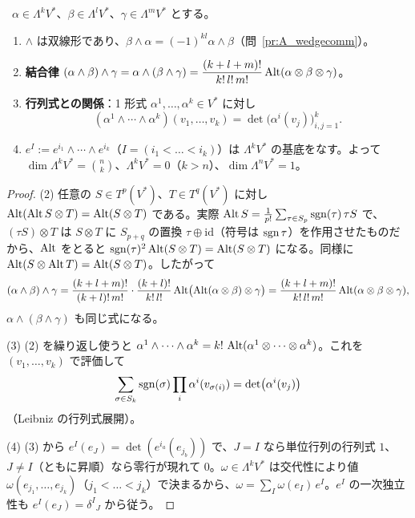 \begin{prop}[外積の基本性質]\label{A:prop:wedge}
\tP\ $\alpha\in\Lambda^kV^*$、$\beta\in\Lambda^lV^*$、$\gamma\in\Lambda^mV^*$ とする。
\begin{enumerate}
\item $\wedge$ は双線形であり、$\beta\wedge\alpha=(-1)^{kl}\alpha\wedge\beta$（問~\ref{pr:A_wedgecomm}）。
\item \textbf{結合律} $(\alpha\wedge\beta)\wedge\gamma=\alpha\wedge(\beta\wedge\gamma)=\dfrac{(k+l+m)!}{k!\,l!\,m!}\operatorname{Alt}(\alpha\otimes\beta\otimes\gamma)$。
\item \textbf{行列式との関係}：1 形式 $\alpha^1,\dots,\alpha^k\in V^*$ に対し
\[
(\alpha^1\wedge\cdots\wedge\alpha^k)(v_1,\dots,v_k)=\det\bigl(\alpha^i(v_j)\bigr)_{i,j=1}^k .
\]
\item $e^I:=e^{i_1}\wedge\cdots\wedge e^{i_k}$（$I=(i_1<\dots<i_k)$）は $\Lambda^kV^*$ の基底をなす。よって $\dim\Lambda^kV^*=\binom nk$、$\Lambda^kV^*=0$（$k>n$）、$\dim\Lambda^nV^*=1$。
\end{enumerate}
\end{prop}
\begin{proof}
(2) 任意の $S\in T^p(V^*)$、$T\in T^q(V^*)$ に対し $\operatorname{Alt}(\operatorname{Alt} S\otimes T)=\operatorname{Alt}(S\otimes T)$ である。実際 $\operatorname{Alt} S=\frac1{p!}\sum_{\tau\in S_p}\operatorname{sgn}(\tau)\,\tau S$ で、$(\tau S)\otimes T$ は $S\otimes T$ に $S_{p+q}$ の置換 $\tau\oplus\mathrm{id}$（符号は $\operatorname{sgn}\tau$）を作用させたものだから、$\operatorname{Alt}$ をとると $\operatorname{sgn}(\tau)^2\operatorname{Alt}(S\otimes T)=\operatorname{Alt}(S\otimes T)$ になる。同様に $\operatorname{Alt}(S\otimes\operatorname{Alt} T)=\operatorname{Alt}(S\otimes T)$。したがって
\[
(\alpha\wedge\beta)\wedge\gamma=\frac{(k+l+m)!}{(k+l)!\,m!}\cdot\frac{(k+l)!}{k!\,l!}\operatorname{Alt}\bigl(\operatorname{Alt}(\alpha\otimes\beta)\otimes\gamma\bigr)=\frac{(k+l+m)!}{k!\,l!\,m!}\operatorname{Alt}(\alpha\otimes\beta\otimes\gamma),
\]
$\alpha\wedge(\beta\wedge\gamma)$ も同じ式になる。

(3) (2) を繰り返し使うと $\alpha^1\wedge\cdots\wedge\alpha^k=k!\,\operatorname{Alt}(\alpha^1\otimes\cdots\otimes\alpha^k)$。これを $(v_1,\dots,v_k)$ で評価して
\[
\sum_{\sigma\in S_k}\operatorname{sgn}(\sigma)\prod_{i}\alpha^i(v_{\sigma(i)})=\det\bigl(\alpha^i(v_j)\bigr)
\]
（Leibniz の行列式展開）。

(4) (3) から $e^I(e_J)=\det(e^{i_a}(e_{j_b}))$ で、$J=I$ なら単位行列の行列式 $1$、$J\ne I$（ともに昇順）なら零行が現れて $0$。$\omega\in\Lambda^kV^*$ は交代性により値 $\omega(e_{j_1},\dots,e_{j_k})$（$j_1<\dots<j_k$）で決まるから、$\omega=\sum_I\omega(e_I)\,e^I$。$e^I$ の一次独立性も $e^I(e_J)=\delta^I{}_J$ から従う。
\end{proof}

